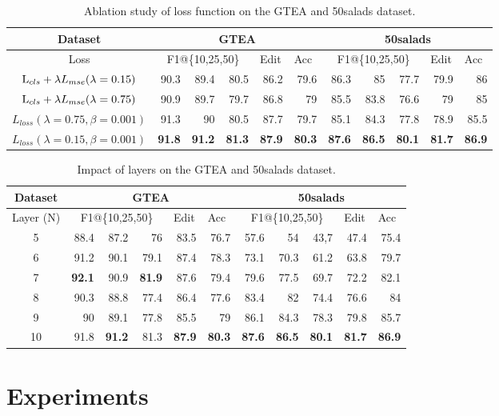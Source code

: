 \documentclass[runningheads]{llncs}
\begin{document}
\begin{table*}[htbp]
	\centering
	\caption{Ablation study of loss function on the GTEA and 50salads dataset.}
\begin{tabular}{crrrrrrrrrr}
		\toprule
		Dataset & \multicolumn{5}{c}{GTEA}              & \multicolumn{5}{c}{50salads} \\
		\midrule
		Loss & \multicolumn{3}{c}{F1@\{10,25,50\}} & \multicolumn{1}{l}{Edit} & \multicolumn{1}{l}{Acc} & \multicolumn{3}{c}{F1@\{10,25,50\}} & \multicolumn{1}{l}{Edit} & \multicolumn{1}{l}{Acc} \\
		\midrule
		$ {\rm{L}}_{cls} + \lambda {L_{mse}} (\lambda=0.15) $ & 90.3  & 89.4  & 80.5    & 86.2  & 79.6  & 86.3  & 85    & 77.7  & 79.9  & 86 \\
		$ {\rm{L}}_{cls} + \lambda {L_{mse}} (\lambda=0.75) $ & 90.9  & 89.7  & 79.7  & 86.8  & 79  & 85.5    & 83.8  & 76.6  & 79  & 85 \\
		$ {L_{loss}} (\lambda=0.75 , \beta=0.001) $  & 91.3 & 90  & 80.5 & 87.7  & 79.7    & 85.1  & 84.3  & 77.8  & 78.9 & 85.5 \\
		$ {L_{loss}} (\lambda=0.15 , \beta=0.001) $ & \textbf{91.8}  & \textbf{91.2} & \textbf{81.3}  & \textbf{87.9} & \textbf{80.3}  & \textbf{87.6} & \textbf{86.5} & \textbf{80.1} & \textbf{81.7} & \textbf{86.9} \\
		\bottomrule
	\end{tabular}\label{tab4}\end{table*}\begin{table*}[ht]
	\centering
	\caption{Impact of layers on the GTEA and 50salads dataset.}
\begin{tabular}{crrrrrrrrrr}
		\toprule
		Dataset & \multicolumn{5}{c}{GTEA}              & \multicolumn{5}{c}{50salads} \\
		\midrule
		Layer (N) & \multicolumn{3}{c}{F1@\{10,25,50\}} & \multicolumn{1}{l}{Edit} & \multicolumn{1}{l}{Acc} & \multicolumn{3}{c}{F1@\{10,25,50\}} & \multicolumn{1}{l}{Edit} & \multicolumn{1}{l}{Acc} \\
		\midrule
		5 & 88.4  & 87.2  & 76    & 83.5  & 76.7  & 57.6  & 54   & 43,7  & 47.4  & 75.4 \\
		6 & 91.2  & 90.1  & 79.1  & 87.4  & 78.3  & 73.1    & 70.3  & 61.2  & 63.8  & 79.7 \\
		7  & \textbf{92.1} & 90.9  & \textbf{81.9} & 87.6  & 79.4    & 79.6  & 77.5  & 69.7  & 72.2 & 82.1 \\
		8 & 90.3  & 88.8  & 77.4  & 86.4  & 77.6  & 83.4  & 82 & 74.4  & 76.6 & 84 \\
		9 & 90 & 89.1 & 77.8  & 85.5  & 79 & 86.1  & 84.3  & 78.3  & 79.8  & 85.7 \\
		10 & 91.8  & \textbf{91.2} & 81.3  & \textbf{87.9} & \textbf{80.3}  & \textbf{87.6} & \textbf{86.5} & \textbf{80.1} & \textbf{81.7} & \textbf{86.9} \\
		\bottomrule
	\end{tabular}\label{tab2}\end{table*}\section{Experiments}
\end{document}
